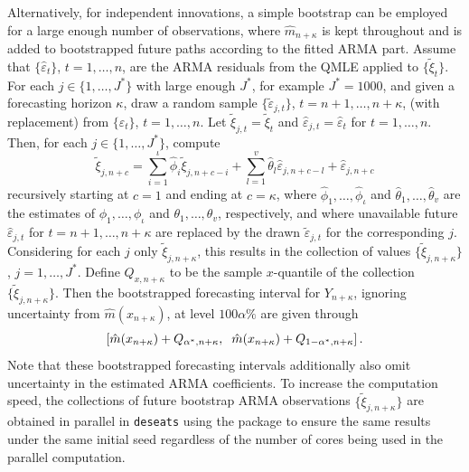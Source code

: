 Alternatively, for independent innovations, a simple bootstrap can be employed for a large enough number of observations, where \(\hat m_{n+\kappa}\) is kept throughout and is added to bootstrapped future paths according to the fitted ARMA part. Assume that \(\{\hat \varepsilon_t\}\), \(t=1,\dots,n\), are the ARMA residuals from the QMLE applied to \(\{\tilde\xi_t\}\). For each \(j\in\{1,\dots,J^{*}\}\) with large enough \(J^{*}\), for example \(J^{*}=1000\), and given a forecasting horizon \(\kappa\), draw a random sample \(\{\tilde \varepsilon_{j,t}\}\), \(t=n+1,\dots,n+\kappa\), (with replacement) from \(\{\hat \varepsilon_t\}\), \(t=1,\dots,n\). Let \(\tilde\xi_{j,t}=\tilde\xi_t\) and \(\hat\varepsilon_{j,t}=\hat\varepsilon_t\) for \(t=1,\dots,n\). Then, for each \(j\in\{1,\dots,J^{*}\}\), compute
\begin{equation}
\tilde\xi_{j,n+c}=\sum_{i=1}^{\iota}\hat\phi_i \tilde\xi_{j,n+c-i} + \sum_{l=1}^{v}\hat\theta_{l}\hat\varepsilon_{j,n+c-l}+\hat\varepsilon_{j,n+c}
\label{eq:fcintbootalgo}
\end{equation}
recursively starting at \(c=1\) and ending at \(c=\kappa\), where \(\hat\phi_1,\dots,\hat\phi_\iota\) and \(\hat\theta_1,\dots,\hat\theta_v\) are the estimates of \(\phi_1,\dots,\phi_\iota\) and \(\theta_1,\dots,\theta_v\), respectively, and where unavailable future \(\hat\varepsilon_{j,t}\) for \(t=n+1,\dots,n+\kappa\) are replaced by the drawn \(\tilde\varepsilon_{j,t}\) for the corresponding \(j\). Considering for each \(j\) only \(\tilde\xi_{j,n+\kappa}\), this results in the collection of values \(\{\tilde\xi_{j,n+\kappa}\}\), \(j=1,\dots,J^{*}\). Define \(Q_{x,n+\kappa}\) to be the sample \(x\)-quantile of the collection \(\{\tilde\xi_{j,n+\kappa}\}\). Then the bootstrapped forecasting interval for \(Y_{n+\kappa}\), ignoring uncertainty from \(\hat m(x_{n+\kappa})\), at level \(100\alpha\%\) are given through
\begin{equation}
\left[\hat m(x_{n+\kappa})+Q_{\alpha^{*},n+\kappa},\hspace{2mm}\hat m(x_{n+\kappa})+Q_{1-\alpha^{*},n+\kappa}\right].
\label{eq:fcintboot}
\end{equation}
Note that these bootstrapped forecasting intervals additionally also omit uncertainty in the estimated ARMA coefficients. To increase the computation speed, the collections of future bootstrap ARMA observations \(\{\tilde\xi_{j,n+\kappa}\}\) are obtained in parallel in \texttt{deseats} using the  package \citep{bengtson2021future} to ensure the same results under the same initial seed regardless of the number of cores being used in the parallel computation.

